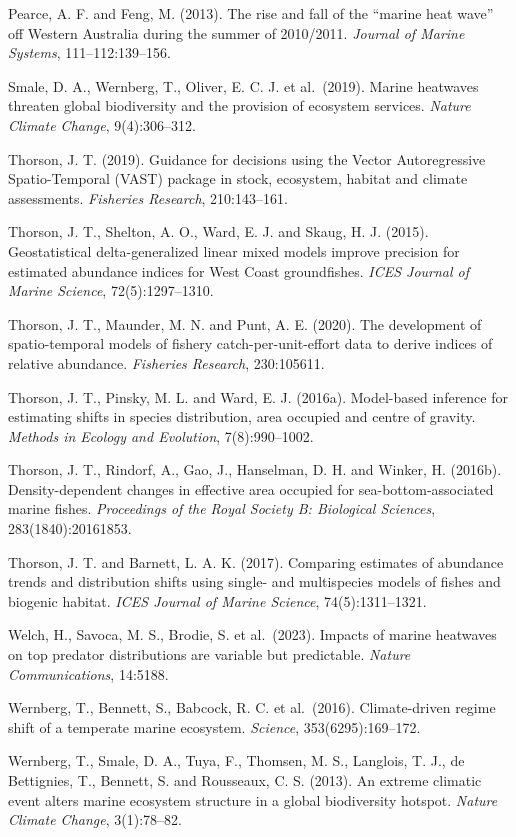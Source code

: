 \documentclass[
  11pt,
  a4paper,
]{article}
\newenvironment{hangparas}{\setlength{\parindent}{-1.5em}\setlength{\leftskip}{1.5em}\setlength{\parskip}{4pt}}{\par}
\begin{document}
\begin{hangparas}
Pearce, A. F. and Feng, M. (2013). The rise and fall of the ``marine
heat wave'' off Western Australia during the summer of 2010/2011.
\emph{Journal of Marine Systems}, 111--112:139--156.

Smale, D. A., Wernberg, T., Oliver, E. C. J. et al.~(2019). Marine
heatwaves threaten global biodiversity and the provision of ecosystem
services. \emph{Nature Climate Change}, 9(4):306--312.

Thorson, J. T. (2019). Guidance for decisions using the Vector
Autoregressive Spatio-Temporal (VAST) package in stock, ecosystem,
habitat and climate assessments. \emph{Fisheries Research},
210:143--161.

Thorson, J. T., Shelton, A. O., Ward, E. J. and Skaug, H. J. (2015).
Geostatistical delta-generalized linear mixed models improve precision
for estimated abundance indices for West Coast groundfishes. \emph{ICES
Journal of Marine Science}, 72(5):1297--1310.

Thorson, J. T., Maunder, M. N. and Punt, A. E. (2020). The development
of spatio-temporal models of fishery catch-per-unit-effort data to
derive indices of relative abundance. \emph{Fisheries Research},
230:105611.

Thorson, J. T., Pinsky, M. L. and Ward, E. J. (2016a). Model-based
inference for estimating shifts in species distribution, area occupied
and centre of gravity. \emph{Methods in Ecology and Evolution},
7(8):990--1002.

Thorson, J. T., Rindorf, A., Gao, J., Hanselman, D. H. and Winker, H.
(2016b). Density-dependent changes in effective area occupied for
sea-bottom-associated marine fishes. \emph{Proceedings of the Royal
Society B: Biological Sciences}, 283(1840):20161853.

Thorson, J. T. and Barnett, L. A. K. (2017). Comparing estimates of
abundance trends and distribution shifts using single- and multispecies
models of fishes and biogenic habitat. \emph{ICES Journal of Marine
Science}, 74(5):1311--1321.

Welch, H., Savoca, M. S., Brodie, S. et al.~(2023). Impacts of marine
heatwaves on top predator distributions are variable but predictable.
\emph{Nature Communications}, 14:5188.

Wernberg, T., Bennett, S., Babcock, R. C. et al.~(2016). Climate-driven
regime shift of a temperate marine ecosystem. \emph{Science},
353(6295):169--172.

Wernberg, T., Smale, D. A., Tuya, F., Thomsen, M. S., Langlois, T. J.,
de Bettignies, T., Bennett, S. and Rousseaux, C. S. (2013). An extreme
climatic event alters marine ecosystem structure in a global
biodiversity hotspot. \emph{Nature Climate Change}, 3(1):78--82.

\end{hangparas}
\end{document}
